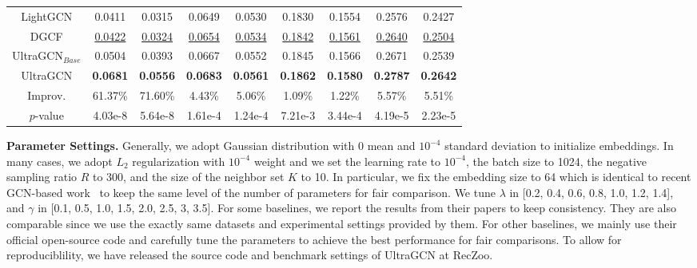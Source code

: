 \documentclass[sigconf,authorversion]{acmart}
\begin{document}
\begin{table*}[!t]
\begin{tabular}{c|cc|cc|cc|cc}
LightGCN               & 0.0411          & 0.0315          & 0.0649          & 0.0530          & 0.1830          & 0.1554          & 0.2576          & 0.2427          \\
DGCF                   & \underline{0.0422}          & \underline{0.0324}          & \underline{0.0654}         & \underline{0.0534}          & \underline{0.1842}          & \underline{0.1561}          & \underline{0.2640}          & \underline{0.2504}          \\ \hline
UltraGCN$_{Base}$               & 0.0504 & 0.0393 & 0.0667 & 0.0552 & 0.1845 & 0.1566 & 0.2671 & 0.2539 \\
UltraGCN               & \textbf{0.0681} & \textbf{0.0556} & \textbf{0.0683} & \textbf{0.0561} & \textbf{0.1862} & \textbf{0.1580} & \textbf{0.2787} & \textbf{0.2642} \\ \hline \hline
Improv.                   &      61.37\%     & 71.60\%& 4.43\%          & 5.06\%          & 1.09\%          & 1.22\%          & 5.57\%          & 5.51\%   \\
$p$-value                   & 4.03e-8          & 5.64e-8& 1.61e-4          & 1.24e-4          & 7.21e-3          & 3.44e-4          & 4.19e-5          & 2.23e-5   \\

\bottomrule
\end{tabular}
\label{overall_res}
\end{table*}





\textbf{Parameter Settings.} 
Generally, we adopt Gaussian distribution with 0 mean and $10^{-4}$ standard deviation to initialize embeddings. In many cases, we adopt $L_2$ regularization with $10^{-4}$ weight and we set the learning rate to $10^{-4}$, the batch size to 1024, the negative sampling ratio $R$ to 300, and the size of the neighbor set $K$ to 10. In particular, we fix the embedding size to 64 which is identical to recent GCN-based work~\cite{NGCF,NIA-GCN,LightGCN,DGCF} to keep the same level of the number of parameters for fair comparison. We tune $\lambda$ in [0.2, 0.4, 0.6, 0.8, 1.0, 1.2, 1.4], and $\gamma$ in [0.1, 0.5, 1.0, 1.5, 2.0, 2.5, 3, 3.5]. For some baselines, we report the results from their papers to keep consistency. They are also comparable since we use the exactly same datasets and experimental settings provided by them. For other baselines, we mainly use their official open-source code and carefully tune the parameters to achieve the best performance for fair comparisons. To allow for reproduciblility, we have released the source code and benchmark settings of UltraGCN at RecZoo.
\end{document}
